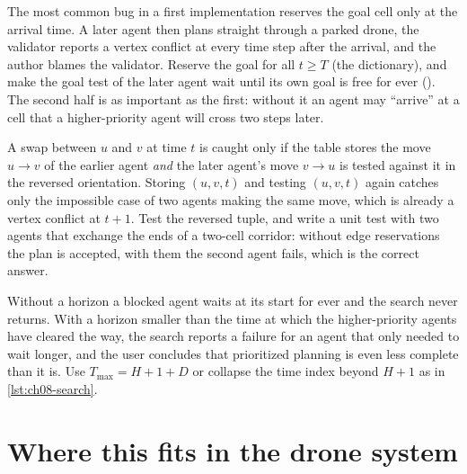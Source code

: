 \begin{pitfall}
The most common bug in a first implementation reserves the goal cell only at the
arrival time. A later agent then plans straight through a parked drone, the validator
reports a vertex conflict at every time step after the arrival, and the author blames
the validator. Reserve the goal for all $t \ge T$ (the  dictionary), and
make the goal test of the later agent wait until its own goal is free for ever
(). The second half is as important as the first: without it an agent
may ``arrive'' at a cell that a higher-priority agent will cross two steps later.
\end{pitfall}

\begin{pitfall}
A swap between $u$ and $v$ at time $t$ is caught only if the table stores the move
$u \to v$ of the earlier agent \emph{and} the later agent's move $v \to u$ is tested
against it in the reversed orientation. Storing $(u, v, t)$ and testing $(u, v, t)$
again catches only the impossible case of two agents making the same move, which is
already a vertex conflict at $t + 1$. Test the reversed tuple, and write a unit test
with two agents that exchange the ends of a two-cell corridor: without edge
reservations the plan is accepted, with them the second agent fails, which is the
correct answer.
\end{pitfall}

\begin{pitfall}
Without a horizon a blocked agent waits at its start for ever and the search never
returns. With a horizon smaller than the time at which the higher-priority agents have
cleared the way, the search reports a failure for an agent that only needed to wait
longer, and the user concludes that prioritized planning is even less complete than it
is. Use $T_{\max} = H + 1 + D$ or collapse the time index beyond $H + 1$ as in
\cref{lst:ch08-search}.
\end{pitfall}

\section{Where this fits in the drone system}
\label{sec:ch08-drone}

